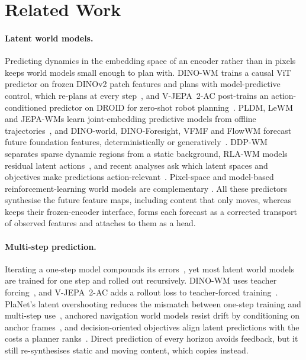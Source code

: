 \section{Related Work}
\label{sec:related}

\paragraph{Latent world models.}
Predicting dynamics in the embedding space of an encoder rather than in pixels keeps world models small enough to plan
with.
%
DINO-WM trains a causal ViT predictor on frozen DINOv2 patch features and plans with model-predictive
control, which re-plans at every step~\citep{zhou2025dinowm,oquab2023dinov2}, and V-JEPA~2-AC post-trains an action-conditioned predictor on DROID for
zero-shot robot planning~\citep{assran2025vjepa2,khazatsky2024droid}.
%
PLDM, LeWM and JEPA-WMs learn joint-embedding predictive models from offline
trajectories~\citep{sobal2025pldm,maes2026lewm,balestriero2025lejepa,terver2026jepawms}, and DINO-world,
DINO-Foresight, VFMF and FlowWM forecast future foundation features, deterministically or
generatively~\citep{baldassarre2025dinoworld,karypidis2025dinoforesight,boduljak2025vfmf,porcher2026flowwm}.
%
DDP-WM separates sparse dynamic regions from a static background, RLA-WM models residual latent
actions~\citep{yin2026ddpwm,zhang2026rlawm}, and recent analyses ask which latent spaces and objectives make predictions
action-relevant~\citep{nilaksh2026reconstruction,yeom2026actionrelevant,zhang2026deltajepa,huang2026nanowm}.
%
Pixel-space and model-based reinforcement-learning world models are complementary
\citep{bar2025nwm,nvidia2025cosmos,hafner2025dreamerv3,hansen2024tdmpc2}.
%
All these predictors synthesise the future feature maps, including content that only moves, whereas \ours{} keeps
their frozen-encoder interface, forms each forecast as a corrected transport of observed features and attaches to them
as a head.

\paragraph{Multi-step prediction.}
Iterating a one-step model compounds its errors~\citep{venkatraman2015multistep}, yet most latent world models are
trained for one step and rolled out recursively.
%
DINO-WM uses teacher forcing~\citep{zhou2025dinowm}, and V-JEPA~2-AC adds a rollout loss to teacher-forced
training~\citep{assran2025vjepa2}.
%
PlaNet's latent overshooting reduces the mismatch between one-step training and multi-step use~\citep{hafner2019planet},
anchored navigation world models resist drift by conditioning on anchor frames~\citep{luan2026anchorednwm}, and
decision-oriented objectives align latent predictions with the costs a planner ranks~\citep{wang2026dalewm}.
%
Direct prediction of every horizon avoids feedback, but it still re-synthesises static and moving
content, which \ours{} copies instead.

